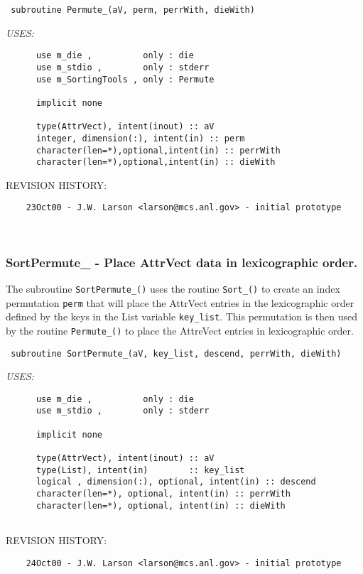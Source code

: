 \begin{verbatim} 
 subroutine Permute_(aV, perm, perrWith, dieWith)\end{verbatim}{\em USES:}
\begin{verbatim}      use m_die ,          only : die
      use m_stdio ,        only : stderr
      use m_SortingTools , only : Permute
 
      implicit none
 
      type(AttrVect), intent(inout) :: aV
      integer, dimension(:), intent(in) :: perm
      character(len=*),optional,intent(in) :: perrWith
      character(len=*),optional,intent(in) :: dieWith
 \end{verbatim}{\sf REVISION HISTORY:}
\begin{verbatim}  	23Oct00 - J.W. Larson <larson@mcs.anl.gov> - initial prototype\end{verbatim}
 
 
\mbox{}\hrulefill\ 
 

 \subsubsection{SortPermute\_ - Place AttrVect data in lexicographic order.}


 
 
  The subroutine {\tt SortPermute\_()} uses the routine {\tt Sort\_()} 
  to create an index permutation {\tt perm} that will place the AttrVect
  entries in the lexicographic order defined by the keys in the List 
  variable {\tt key\_list}.  This permutation is then used by the routine
  {\tt Permute\_()} to place the AttreVect entries in lexicographic order.
 
\begin{verbatim} 
 subroutine SortPermute_(aV, key_list, descend, perrWith, dieWith)\end{verbatim}{\em USES:}
\begin{verbatim}      use m_die ,          only : die
      use m_stdio ,        only : stderr
 
      implicit none
 
      type(AttrVect), intent(inout) :: aV
      type(List), intent(in)        :: key_list
      logical , dimension(:), optional, intent(in) :: descend
      character(len=*), optional, intent(in) :: perrWith
      character(len=*), optional, intent(in) :: dieWith
 
 \end{verbatim}{\sf REVISION HISTORY:}
\begin{verbatim}  	24Oct00 - J.W. Larson <larson@mcs.anl.gov> - initial prototype\end{verbatim}

